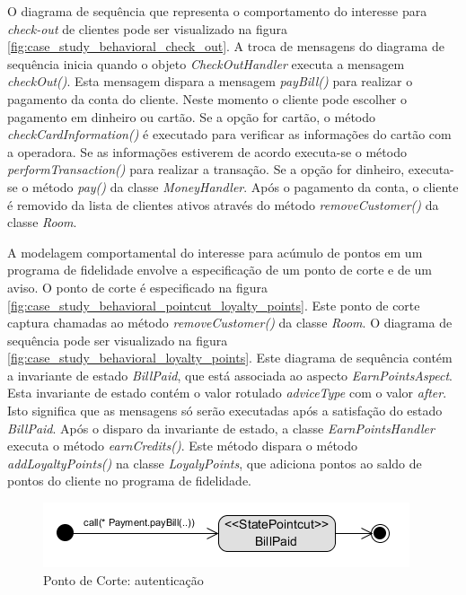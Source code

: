 O diagrama de sequência que representa o comportamento do interesse para \textit{check-out} de clientes pode ser visualizado na figura
\ref{fig:case_study_behavioral_check_out}. A troca de mensagens do diagrama de sequência inicia quando o objeto \textit{CheckOutHandler} executa a
mensagem \textit{checkOut()}. Esta mensagem dispara a mensagem \textit{payBill()} para realizar o pagamento da conta do cliente. Neste momento o
cliente pode escolher o pagamento em dinheiro ou cartão. Se a opção for cartão, o método \textit{checkCardInformation()} é executado para
verificar as informações do cartão com a operadora. Se as informações estiverem de acordo executa-se o método \textit{performTransaction()} para
realizar a transação. Se a opção for dinheiro, executa-se o método \textit{pay()} da classe \textit{MoneyHandler}. Após o pagamento da conta, o
cliente é removido da lista de clientes ativos através do método \textit{removeCustomer()} da classe \textit{Room}.

A modelagem comportamental do interesse para acúmulo de pontos em um programa de fidelidade envolve a especificação de um ponto de corte e de um
aviso. O ponto de corte é especificado na figura \ref{fig:case_study_behavioral_pointcut_loyalty_points}. Este ponto de corte captura chamadas ao
método \textit{removeCustomer()} da classe \textit{Room}. O diagrama de sequência pode ser visualizado na figura
\ref{fig:case_study_behavioral_loyalty_points}. Este diagrama de sequência contém a invariante de estado \textit{BillPaid}, que está associada ao
aspecto \textit{EarnPointsAspect}. Esta invariante de estado contém o valor rotulado \textit{adviceType} com o valor \textit{after}. Isto significa que as
mensagens só serão executadas após a satisfação do estado \textit{BillPaid}. Após o disparo da invariante de estado, a classe
\textit{EarnPointsHandler} executa o método \textit{earnCredits()}. Este método dispara o método \textit{addLoyaltyPoints()} na classe
\textit{LoyalyPoints}, que adiciona pontos ao saldo de pontos do cliente no programa de fidelidade.

  \begin{figure}
	\centering
	\includegraphics{img/case_study_behavioral_pointcut_authentication.png}
	\caption{Ponto de Corte: autenticação}\label{fig:case_study_behavioral_pointcut_authentication}
  \end{figure}

